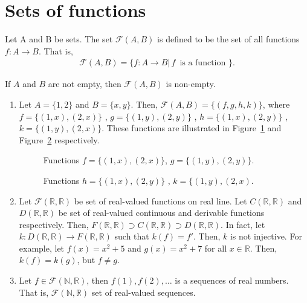 \documentclass[a4paper,english,12pt]{article}   	%
\begin{document}
\section{Sets of functions}
\begin{defn} Let A and B be sets. The set $\mathcal{F}(A,B)$ is defined to be the set of all functions $f \colon A \to B$. That is,
\begin{align*}
\mathcal{F}(A,B) = \{f \colon A \to B |\, f \,\text{ is a function }\}.
\end{align*}
\end{defn}
\begin{rem} If $A$ and $B$ are not empty, then $\mathcal{F}(A,B)$ is non-empty.
\end{rem}
\begin{exmp} 
\begin{enumerate}
\item Let $A=\{1,2\}$ and $B=\{x,y\}$. Then, $\mathcal{F}(A,B) = \{ (f,g,h,k)\}$, where $f=\{(1,x),(2,x)\}$ , $g=\{(1,y),(2,y)\}$ , $h=\{(1,x),(2,y)\}$ , $k=\{(1,y),(2,x)\}$. These functions are illustrated in Figure~\ref{Fig:fg} and Figure~\ref{Fig:hk} respectively.
\begin{figure}[hhhh]
\centering
\scalebox{.8}{ }
\caption{Functions $f = \{(1,x),(2,x)\}$, $g = \{(1,y),(2,y)\}$.}
\label{Fig:fg}
\end{figure}
\begin{figure}[hhhh]
\centering
\scalebox{.8}{ }
\caption{Functions $h=\{(1,x),(2,y)\}$ , $k=\{(1,y),(2,x)$.}
\label{Fig:hk}
\end{figure}
\item Let $\mathcal{F}(\mathbb{R}, \mathbb{R})$ be set of real-valued functions on real line. Let $C(\mathbb{R}, \mathbb{R})$ and $D(\mathbb{R}, \mathbb{R})$ be set of real-valued continuous and derivable functions respectively. Then, $F(\mathbb{R},\mathbb{R}) \supset C(\mathbb{R},\mathbb{R}) \supset D(\mathbb{R},\mathbb{R})$. In fact, let $k \colon D(\mathbb{R},\mathbb{R}) \to F(\mathbb{R},\mathbb{R})$ such that $k(f)=f'$. Then, $k$ is not injective. For example, let $f(x) = x^2 + 5$ and $g(x) = x^2 + 7$ for all $x \in \mathbb{R}$. Then, $k(f) = k(g)$, but $f \neq g$.
\item Let $f \in \mathcal{F}(\mathbb{N},\mathbb{R})$, then $f(1),f(2),\ldots$ is a sequences of real numbers. That is, $\mathcal{F}(\mathbb{N},\mathbb{R})$ set of real-valued sequences.
\end{enumerate}
\end{exmp}
\end{document}
